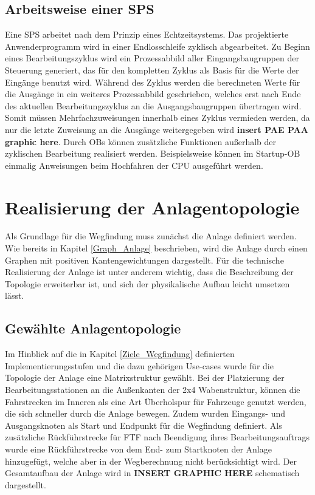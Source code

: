 	
		\subsection{Arbeitsweise einer SPS}
			
			Eine \acl{SPS} arbeitet nach dem Prinzip eines Echtzeitsystems. Das projektierte Anwenderprogramm wird in einer Endlosschleife zyklisch abgearbeitet. Zu Beginn eines Bearbeitungszyklus wird ein Prozessabbild aller Eingangsbaugruppen  der Steuerung generiert, das für den kompletten Zyklus als Basis für die Werte der Eingänge benutzt wird. Während des Zyklus werden die berechneten Werte für die Ausgänge in ein weiteres Prozessabbild geschrieben, welches erst nach Ende des aktuellen Bearbeitungszyklus an die Ausgangsbaugruppen übertragen wird. Somit müssen Mehrfachzuweisungen innerhalb eines Zyklus vermieden werden, da nur die letzte Zuweisung an die Ausgänge weitergegeben wird \textbf{insert PAE PAA graphic here}. Durch \ac{OB}s können zusätzliche Funktionen außerhalb der zyklischen Bearbeitung realisiert werden. Beispielsweise können im Startup-\ac{OB} einmalig Anweisungen beim Hochfahren der CPU ausgeführt werden.
	
	\section{Realisierung der Anlagentopologie}
		
		Als Grundlage für die Wegfindung muss zunächst die Anlage definiert werden. Wie bereits in Kapitel \ref{Graph_Anlage} beschrieben, wird die Anlage durch einen Graphen mit positiven Kantengewichtungen dargestellt. Für die technische Realisierung der Anlage ist unter anderem wichtig, dass die Beschreibung der Topologie erweiterbar ist, und sich der physikalische Aufbau leicht umsetzen lässt.
		
		\subsection{Gewählte Anlagentopologie}
			
			Im Hinblick auf die in Kapitel \ref{Ziele_Wegfindung} definierten Implementierungsstufen und die dazu gehörigen Use-cases wurde für die Topologie der Anlage eine Matrixstruktur gewählt.  Bei der Platzierung der Bearbeitungsstationen an die Außenkanten der 2x4 Wabenstruktur, können die Fahrstrecken im Inneren als eine Art Überholspur für Fahrzeuge genutzt werden, die sich schneller durch die Anlage bewegen. Zudem wurden Eingangs- und Ausgangsknoten als Start und Endpunkt für die Wegfindung definiert. Als zusätzliche Rückführstrecke für \ac{FTF} nach Beendigung ihres Bearbeitungsauftrags wurde eine Rückführstrecke von dem End- zum Startknoten der Anlage hinzugefügt, welche aber in der Wegberechnung nicht berücksichtigt wird. Der Gesamtaufbau der Anlage wird in \textbf{INSERT GRAPHIC HERE} schematisch dargestellt.
		
